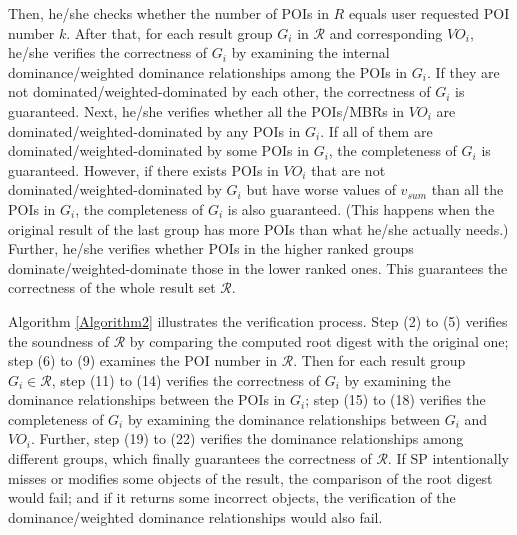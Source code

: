 \documentclass[10pt, conference, compsocconf]{IEEEtran}
\begin{document}
Then, he/she checks whether the number of POIs in $R$ equals user requested POI number $k$. After that, for each result group $G_i$ in $\mathcal{R}$ and corresponding $VO_i$, he/she verifies the correctness of $G_i$ by examining the internal dominance/weighted dominance relationships among the POIs in $G_i$. If they are not dominated/weighted-dominated by each other, the correctness of $G_i$ is guaranteed. Next, he/she verifies whether all the POIs/MBRs in $VO_i$ are dominated/weighted-dominated by any POIs in $G_i$. If all of them are dominated/weighted-dominated by some POIs in $G_i$, the completeness of $G_i$ is guaranteed. However, if there exists POIs in $VO_i$ that are not dominated/weighted-dominated by $G_i$ but have worse values of $v_{sum}$ than all the POIs in $G_i$, the completeness of $G_i$ is also guaranteed. (This happens when the original result of the last group has more POIs than what he/she actually needs.) Further, he/she verifies whether POIs in the higher ranked groups dominate/weighted-dominate those in the lower ranked ones. This guarantees the correctness of the whole result set $\mathcal{R}$.

Algorithm \ref{Algorithm2} illustrates the verification process. Step (2) to (5) verifies the soundness of $\mathcal{R}$ by comparing the computed root digest with the original one; step (6) to (9) examines the POI number in $\mathcal{R}$. Then for each result group $G_i \in \mathcal{R}$, step (11) to (14) verifies the correctness of $G_i$ by examining the dominance relationships between the POIs in $G_i$; step (15) to (18) verifies the completeness of $G_i$ by examining the dominance relationships between $G_i$ and $VO_i$. Further, step (19) to (22) verifies the dominance relationships among different groups, which finally guarantees the correctness of $\mathcal{R}$. If SP intentionally misses or modifies some objects of the result, the comparison of the root digest would fail; and if it returns some incorrect objects, the verification of the dominance/weighted dominance relationships would also fail.
\end{document}
